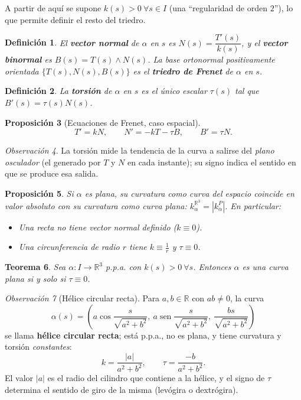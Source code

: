 \documentclass[11pt]{article}
\DeclareMathOperator{\sen}{sen}
\theoremstyle{plain}
\newtheorem{teorema}{Teorema}[section]
\newtheorem{definicion}[teorema]{Definición}
\newtheorem{proposicion}[teorema]{Proposición}
\theoremstyle{definition}
\theoremstyle{remark}
\newtheorem{observacion}[teorema]{Observación}
\begin{document}
A partir de aquí se supone $k(s)>0\ \forall s\in I$ (una ``regularidad de orden $2$''), lo que permite definir el resto del triedro.

\begin{definicion}
El \textbf{vector normal} de $\alpha$ en $s$ es $N(s)=\dfrac{T'(s)}{k(s)}$, y el \textbf{vector binormal} es $B(s)=T(s)\land N(s)$. La base ortonormal positivamente orientada $\{T(s),N(s),B(s)\}$ es el \textbf{triedro de Frenet} de $\alpha$ en $s$.
\end{definicion}

\begin{definicion}
La \textbf{torsión} de $\alpha$ en $s$ es el único escalar $\tau(s)$ tal que $B'(s)=\tau(s)N(s)$.
\end{definicion}

\begin{proposicion}[Ecuaciones de Frenet, caso espacial]
\[
\boxed{T'=kN, \qquad N'=-kT-\tau B, \qquad B'=\tau N}.
\]
\end{proposicion}

\begin{observacion}
La torsión mide la tendencia de la curva a salirse del \emph{plano osculador} (el generado por $T$ y $N$ en cada instante); su signo indica el sentido en que se produce esa salida.
\end{observacion}

\begin{proposicion}
Si $\alpha$ es plana, su curvatura como curva del espacio coincide en valor absoluto con su curvatura como curva plana: $k_\alpha^{\mathbb{R}^3}=|k_\alpha^{P}|$. En particular:
\begin{itemize}
\item Una recta no tiene vector normal definido ($k\equiv0$).
\item Una circunferencia de radio $r$ tiene $k\equiv\tfrac1r$ y $\tau\equiv0$.
\end{itemize}
\end{proposicion}

\begin{teorema}
Sea $\alpha:I\to\mathbb{R}^3$ p.p.a. con $k(s)>0\ \forall s$. Entonces $\alpha$ es una curva plana si y solo si $\tau\equiv0$.
\end{teorema}

\begin{observacion}[Hélice circular recta]
Para $a,b\in\mathbb{R}$ con $ab\neq0$, la curva
\[
\alpha(s)=\left(a\cos\frac{s}{\sqrt{a^2+b^2}},\ a\sen\frac{s}{\sqrt{a^2+b^2}},\ \frac{bs}{\sqrt{a^2+b^2}}\right)
\]
se llama \textbf{hélice circular recta}; está p.p.a., no es plana, y tiene curvatura y torsión \emph{constantes}:
\[
\boxed{k=\frac{|a|}{a^2+b^2}, \qquad \tau=\frac{-b}{a^2+b^2}}.
\]
El valor $|a|$ es el radio del cilindro que contiene a la hélice, y el signo de $\tau$ determina el sentido de giro de la misma (levógira o dextrógira).
\end{observacion}
\end{document}
